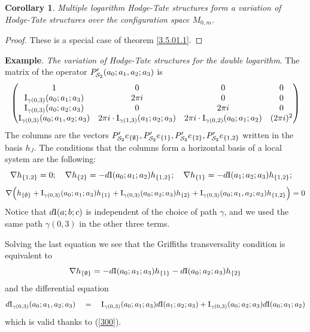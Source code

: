 \documentclass[10pt]{article}
\newtheorem{corollary}[theorem]{Corollary}
\begin{document}
 \begin{corollary} \label{CPa2} Multiple logarithm Hodge-Tate structures form 
 a variation of Hodge-Tate structures over the configuration space $M_{0,m}$.  
\end{corollary}

\begin{proof} These is a special case of theorem \ref{3.5.01.1}. 


\end{proof}

{\bf Example}. {\it The variation of Hodge-Tate structures for the double logarithm}. The matrix of the operator $P'_{{\cal S}_2} (a_0; a_1, a_2; a_3)$ is 
$$ 
\left (\begin{matrix}1&0&0&0 \\ {{\rm I}}_{\gamma(0,3)}(a_0; a_1; a_3) & 2 \pi i &0&0 \\ {{\rm I}}_{\gamma(0,3)}(a_0; a_2; a_3) &0&
    2 \pi i&0\\ {\rm I}_{\gamma(0,3)}(a_0; a_1, a_2; a_3) 
& 
2 \pi i \cdot {{\rm I}}_{\gamma(1,3)}(a_1; a_2; a_3) &    
 2 \pi i \cdot {{\rm I}}_{\gamma(0,2)}(a_0; a_1; a_2)&(2 \pi i)^2 \\\end{matrix}\right ) 
$$ 
The columns are the vectors $P'_{{\cal S}_2}e_{\{\emptyset\}}, 
P'_{{\cal S}_2}e_{\{1\}}, P'_{{\cal S}_2}e_{\{2\}}, P'_{{\cal S}_2}e_{\{1,2\}}$ 
written in the basis $h_{J}$. 
The conditions that the columns form a horizontal basis of a 
local system are the following:
$$
\nabla h_{\{1,2\}} = 0; \quad \nabla h_{\{2\}}  = - d{\rm I}(a_0; a_1; a_2) 
h_{\{1,2\}}; \quad 
\nabla h_{\{1\}} = - d{\rm I}(a_1; a_2; a_3) h_{\{1,2\}}; \quad 
$$
$$
\nabla \Bigl(h_{\{\emptyset\}} + {\rm I}_{\gamma(0,3)}(a_0; a_1; a_3) h_{\{1\}} + 
{\rm I}_{\gamma(0,3)}(a_0; a_2; a_3) h_{\{2\}} + 
{\rm I}_{\gamma(0,3)}(a_0; a_1, a_2;a_3) 
h_{\{1,2\}}\Bigr) = 0
$$
Notice that $d{\rm I}(a; b; c)$ is independent 
of the choice of path $\gamma$, and we used the same path 
$\gamma(0,3)$ in the other three 
terms. 

Solving the last equation we see that the Griffiths transversality condition is equivalent to
$$
\nabla h_{\{\emptyset\}} = - d{\rm I}(a_0; a_1; a_3) h_{\{1\}} - d{\rm I}(a_0; a_2; a_3) h_{\{2\}}
$$
and  the differential equation 
$$
d{\rm I}_{\gamma(0,3)}(a_0; a_1, a_2;a_3) \quad = \quad 
{\rm I}_{\gamma(0,3)}(a_0; a_1; a_3) d{\rm I}(a_1; a_2; a_3) + 
{\rm I}_{\gamma(0,3)}(a_0; a_2; a_3) d{\rm I}(a_0; a_1; a_2)
$$
 which is valid thanks to (\ref{300}). 
\end{document}

